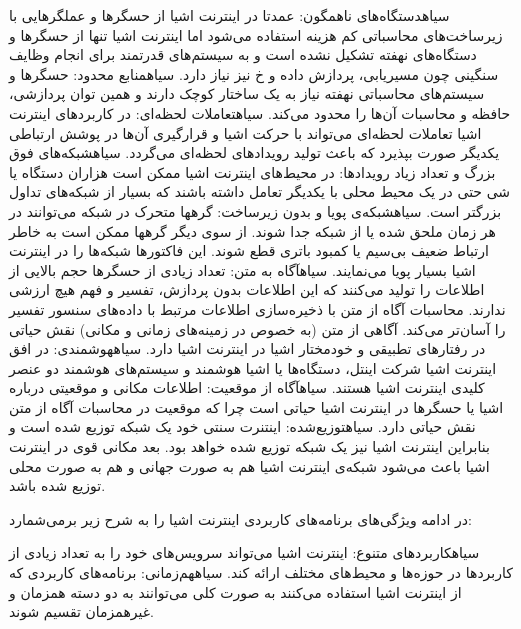  ‌سیاه{دستگاه‌های ناهمگون}: عمدتا در اینترنت اشیا از حسگرها و عملگرهایی با زیرساخت‌های محاسباتی کم هزینه استفاده می‌شود اما
اینترنت اشیا تنها از حسگرها و دستگاه‌های نهفته تشکیل نشده است و به سیستم‌های قدرتمند برای انجام وظایف سنگینی چون مسیریابی، پردازش داده
و ‌خ نیز نیاز دارد.
 ‌سیاه{منابع محدود}: حسگرها و سیستم‌های محاسباتی نهفته نیاز به یک ساختار کوچک دارند و همین توان پردازشی، حافظه و محاسبات آن‌ها را محدود می‌کند.
 ‌سیاه{تعاملات لحظه‌ای}: در کاربردهای اینترنت اشیا تعاملات لحظه‌ای می‌تواند با حرکت اشیا و قرارگیری آن‌ها در پوشش ارتباطی یکدیگر صورت بپذیرد که باعث
تولید رویدادهای لحظه‌ای می‌گردد.
 ‌سیاه{شبکه‌های فوق بزرگ و تعداد زیاد رویدادها}: در محیط‌های اینترنت اشیا ممکن است هزاران دستگاه یا شی حتی در یک محیط محلی با یکدیگر تعامل داشته باشند
که بسیار از شبکه‌های تداول بزرگتر است.
 ‌سیاه{شبکه‌ی پویا و بدون زیرساخت}: گرهها متحرک در شبکه می‌توانند در هر زمان ملحق شده یا از شبکه جدا شوند. از سوی دیگر گرهها ممکن است به خاطر ارتباط ضعیف بی‌سیم
یا کمبود باتری قطع شوند. این فاکتورها شبکه‌ها را در اینترنت اشیا بسیار پویا می‌نمایند.
 ‌سیاه{آگاه به متن}: تعداد زیادی از حسگرها حجم بالایی از اطلاعات را تولید می‌کنند که این اطلاعات بدون پردازش، تفسیر و فهم هیچ ارزشی ندارند.
محاسبات آگاه از متن با ذخیره‌سازی اطلاعات مرتبط با داده‌های سنسور تفسیر را آسان‌تر می‌کند.
آگاهی از متن (به خصوص در زمینه‌های زمانی و مکانی) نقش حیاتی در رفتارهای تطبیقی و خودمختار اشیا در اینترنت اشیا دارد.
 ‌سیاه{هوشمندی}: در افق اینترنت اشیا شرکت اینتل، دستگاه‌ها یا اشیا هوشمند و سیستم‌های هوشمند دو عنصر کلیدی اینترنت اشیا هستند.
 ‌سیاه{آگاه از موقعیت}: اطلاعات مکانی و موقعیتی درباره اشیا یا حسگرها در اینترنت اشیا حیاتی است چرا که
موقعیت در محاسبات آگاه از متن نقش حیاتی دارد.
 ‌سیاه{توزیع‌شده}: اینتنرت سنتی خود یک شبکه توزیع شده است و بنابراین اینترنت اشیا نیز یک شبکه توزیع شده خواهد بود.
بعد مکانی قوی در اینترنت اشیا باعث می‌شود شبکه‌ی اینترنت اشیا هم به صورت جهانی و هم به صورت محلی توزیع شده باشد.

در ادامه  ویژگی‌های برنامه‌های کاربردی اینترنت اشیا را به شرح زیر برمی‌شمارد:

 ‌سیاه{کاربردهای متنوع}: اینترنت اشیا می‌تواند سرویس‌های خود را به تعداد زیادی از کاربردها در حوزه‌ها و محیط‌های مختلف ارائه کند.
 ‌سیاه{هم‌زمانی}: برنامه‌های کاربردی که از اینترنت اشیا استفاده می‌کنند به صورت کلی می‌توانند به دو دسته همزمان و غیرهمزمان تقسیم شوند.


